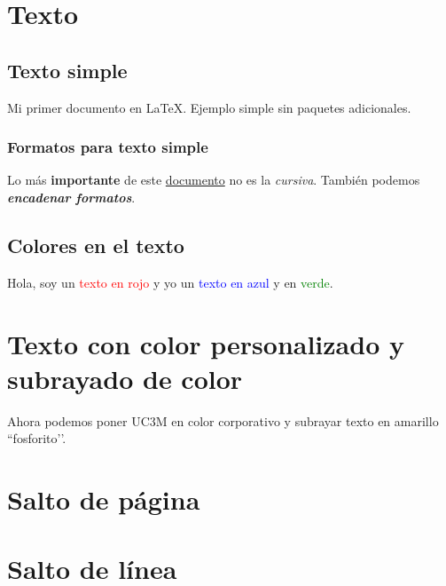 \section{Texto}

\subsection{Texto simple}

Mi primer documento en \LaTeX. Ejemplo simple
sin paquetes adicionales.


\subsubsection{Formatos para texto simple}

Lo más \textbf{importante}
de este \underline{documento} 
no es la \textit{cursiva}.
También podemos \textbf{\textit{encadenar formatos}}.


\subsection{Colores en el texto}

Hola, soy un \textcolor{red}{texto en rojo} y yo un \textcolor{blue}{texto en azul} y en \textcolor{green}{verde}.


\section{Texto con color personalizado y subrayado de color}

Ahora podemos poner \textcolor{azulUC3M}{UC3M} en color corporativo y \colorbox{amarilloFosforito}{subrayar texto} en amarillo ``fosforito’’.


\section{Salto de página}

\newpage


\section{Salto de línea}

